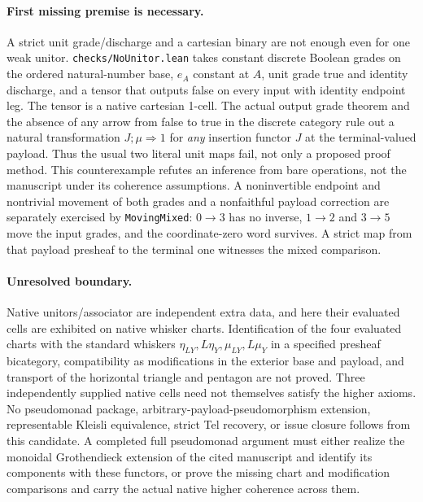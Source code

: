\documentclass{article}
\begin{document}
\paragraph{First missing premise is necessary.} A strict unit grade/discharge and a cartesian binary are not enough even for one weak unitor. \texttt{checks/NoUnitor.lean} takes constant discrete Boolean grades on the ordered natural-number base, $e_A$ constant at $A$, unit grade true and identity discharge, and a tensor that outputs false on every input with identity endpoint leg. The tensor is a native cartesian 1-cell. The actual output grade theorem and the absence of any arrow from false to true in the discrete category rule out a natural transformation $J;\mu\Rightarrow1$ for \emph{any} insertion functor $J$ at the terminal-valued payload. Thus the usual two literal unit maps fail, not only a proposed proof method. This counterexample refutes an inference from bare operations, not the manuscript under its coherence assumptions. A noninvertible endpoint and nontrivial movement of both grades and a nonfaithful payload correction are separately exercised by \texttt{MovingMixed}: $0\to3$ has no inverse, $1\to2$ and $3\to5$ move the input grades, and the coordinate-zero word survives. A strict map from that payload presheaf to the terminal one witnesses the mixed comparison.
\paragraph{Unresolved boundary.} Native unitors/associator are independent extra data, and here their evaluated cells are exhibited on native whisker charts. Identification of the four evaluated charts with the standard whiskers $\eta_{LY},L\eta_Y,\mu_{LY},L\mu_Y$ in a specified presheaf bicategory, compatibility as modifications in the exterior base and payload, and transport of the horizontal triangle and pentagon are not proved. Three independently supplied native cells need not themselves satisfy the higher axioms. No pseudomonad package, arbitrary-payload-pseudomorphism extension, representable Kleisli equivalence, strict Tel recovery, or issue closure follows from this candidate. A completed full pseudomonad argument must either realize the monoidal Grothendieck extension of the cited manuscript and identify its components with these functors, or prove the missing chart and modification comparisons and carry the actual native higher coherence across them.
\end{document}
